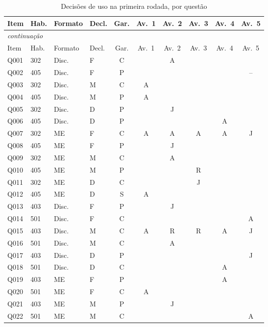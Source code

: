 {\small
\begin{longtable}{llllcccccc}
\caption{Decisões de uso na primeira rodada, por questão}\label{tab:apendice-respostas}\\
\toprule
Item & Hab. & Formato & Decl. & Gar. & Av.~1 & Av.~2 & Av.~3 & Av.~4 & Av.~5 \\
\midrule
\endfirsthead
\multicolumn{10}{l}{\footnotesize\emph{continuação}}\\
\toprule
Item & Hab. & Formato & Decl. & Gar. & Av.~1 & Av.~2 & Av.~3 & Av.~4 & Av.~5 \\
\midrule
\endhead
\bottomrule
\endfoot
Q001 & 302 & Disc. & F & C &  & A &  &  &  \\
Q002 & 405 & Disc. & F & P &  &  &  &  & -- \\
Q003 & 302 & Disc. & M & C & A &  &  &  &  \\
Q004 & 405 & Disc. & M & P & A &  &  &  &  \\
Q005 & 302 & Disc. & D & P &  & J &  &  &  \\
Q006 & 405 & Disc. & D & P &  &  &  & A &  \\
Q007 & 302 & ME & F & C & A & A & A & A & J \\
Q008 & 405 & ME & F & P &  & J &  &  &  \\
Q009 & 302 & ME & M & C &  & A &  &  &  \\
Q010 & 405 & ME & M & P &  &  & R &  &  \\
Q011 & 302 & ME & D & C &  &  & J &  &  \\
Q012 & 405 & ME & D & S & A &  &  &  &  \\
Q013 & 403 & Disc. & F & P &  & J &  &  &  \\
Q014 & 501 & Disc. & F & C &  &  &  &  & A \\
Q015 & 403 & Disc. & M & C & A & R & R & A & J \\
Q016 & 501 & Disc. & M & C &  & A &  &  &  \\
Q017 & 403 & Disc. & D & P &  &  &  &  & J \\
Q018 & 501 & Disc. & D & C &  &  &  & A &  \\
Q019 & 403 & ME & F & P &  &  &  & A &  \\
Q020 & 501 & ME & F & C & A &  &  &  &  \\
Q021 & 403 & ME & M & P &  & J &  &  &  \\
Q022 & 501 & ME & M & C &  &  &  &  & A \\

\end{longtable}}
